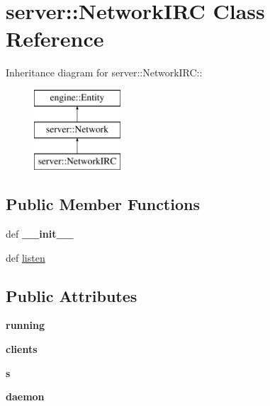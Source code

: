 \hypertarget{classserver_1_1NetworkIRC}{
\section{server::NetworkIRC Class Reference}
\label{classserver_1_1NetworkIRC}
}
Inheritance diagram for server::NetworkIRC::\begin{figure}[H]
\begin{center}
\leavevmode
\includegraphics[height=3cm]{classserver_1_1NetworkIRC}
\end{center}
\end{figure}
\subsection*{Public Member Functions}
\begin{DoxyCompactItemize}
\item 
\hypertarget{classserver_1_1NetworkIRC_a8b676c2c1d86fa2448e01bd0b659fc8a}{
def {\bfseries \_\-\_\-init\_\-\_\-}}
\label{classserver_1_1NetworkIRC_a8b676c2c1d86fa2448e01bd0b659fc8a}

\item 
def \hyperlink{classserver_1_1NetworkIRC_ae45074cb1b23332c54b323d5304d5512}{listen}
\end{DoxyCompactItemize}
\subsection*{Public Attributes}
\begin{DoxyCompactItemize}
\item 
\hypertarget{classserver_1_1NetworkIRC_a7a09e14ca3c016aec6d1ddad7e4e1c81}{
{\bfseries running}}
\label{classserver_1_1NetworkIRC_a7a09e14ca3c016aec6d1ddad7e4e1c81}

\item 
\hypertarget{classserver_1_1NetworkIRC_aaaf9e4af59b0c0145b9ec747cad98b7b}{
{\bfseries clients}}
\label{classserver_1_1NetworkIRC_aaaf9e4af59b0c0145b9ec747cad98b7b}

\item 
\hypertarget{classserver_1_1NetworkIRC_af6a4f6061cdf212a1e069d20be1ec2a4}{
{\bfseries s}}
\label{classserver_1_1NetworkIRC_af6a4f6061cdf212a1e069d20be1ec2a4}

\item 
\hypertarget{classserver_1_1NetworkIRC_a14719c8d15b50aeee60b5edccba3f49c}{
{\bfseries daemon}}
\label{classserver_1_1NetworkIRC_a14719c8d15b50aeee60b5edccba3f49c}

\end{DoxyCompactItemize}


